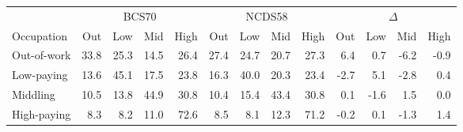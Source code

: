 
\begin{tabular}{lrrrrrrrrrrrr}
\toprule
\multicolumn{1}{c}{} & \multicolumn{4}{c}{BCS70} & \multicolumn{4}{c}{NCDS58} & \multicolumn{4}{c}{$\Delta$} \\
\cmidrule(l{3pt}r{3pt}){2-5} \cmidrule(l{3pt}r{3pt}){6-9} \cmidrule(l{3pt}r{3pt}){10-13}
Occupation & Out & Low & Mid & High & Out & Low & Mid & High & Out & Low & Mid & High\\
\midrule
Out-of-work & 33.8 & 25.3 & 14.5 & 26.4 & 27.4 & 24.7 & 20.7 & 27.3 & 6.4 & 0.7 & -6.2 & -0.9\\
Low-paying & 13.6 & 45.1 & 17.5 & 23.8 & 16.3 & 40.0 & 20.3 & 23.4 & -2.7 & 5.1 & -2.8 & 0.4\\
Middling & 10.5 & 13.8 & 44.9 & 30.8 & 10.4 & 15.4 & 43.4 & 30.8 & 0.1 & -1.6 & 1.5 & 0.0\\
High-paying & 8.3 & 8.2 & 11.0 & 72.6 & 8.5 & 8.1 & 12.3 & 71.2 & -0.2 & 0.1 & -1.3 & 1.4\\
\bottomrule
\end{tabular}
